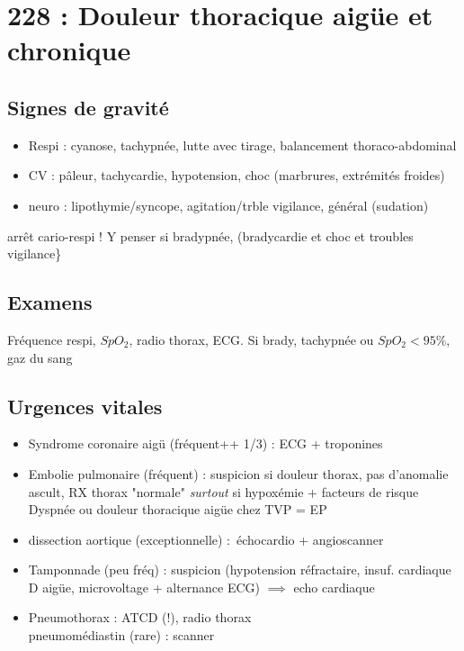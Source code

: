 \documentclass{article}
\begin{document}
\appendix
\section{228 : Douleur thoracique aigüe et chronique}%
\label{sec:228_douleur_thoracique_aigue_et_chronique}

\subsection{Signes de gravité}
\begin{itemize}
\item Respi : cyanose, tachypnée, lutte avec tirage, balancement thoraco-abdominal
\item CV : pâleur, tachycardie, hypotension, choc (marbrures, extrémités
  froides)
\item neuro : lipothymie/syncope, agitation/trble vigilance, général (sudation)
\end{itemize}

\danger arrêt cario-respi ! Y penser si bradypnée, (bradycardie et choc et troubles vigilance\}

\subsection{Examens}
Fréquence respi, $SpO_2$, radio thorax, ECG.
Si {brady, tachy}pnée ou $SpO_2 < 95\%$, gaz du sang

\subsection{Urgences vitales}
\begin{itemize}
\item Syndrome coronaire aigü (fréquent++ 1/3) : ECG + troponines
\item Embolie pulmonaire (fréquent) : suspicion si douleur thorax, pas
  d'anomalie ascult, RX thorax "normale" \textit{surtout}  si hypoxémie +
  facteurs de risque\\
  Dyspnée ou douleur thoracique aigüe chez TVP = EP
\item dissection aortique (exceptionnelle) : échocardio + angioscanner
\item Tamponnade (peu fréq) : suspicion (hypotension réfractaire, insuf.
  cardiaque D aigüe, microvoltage + alternance ECG) $\implies$ echo cardiaque
\item Pneumothorax : ATCD (!), radio thorax \\
  pneumomédiastin (rare) : scanner
\end{itemize}
\end{document}
